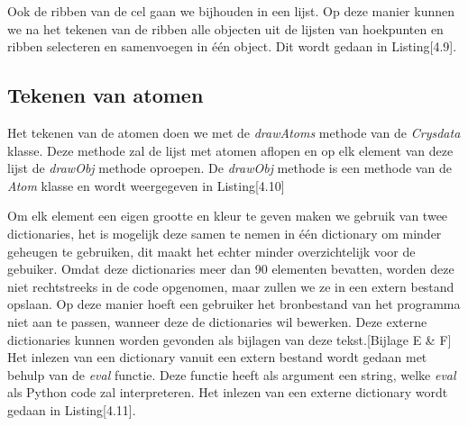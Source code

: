 Ook de ribben van de cel gaan we bijhouden in een lijst. Op deze manier kunnen we na het tekenen van de ribben alle objecten uit de lijsten van hoekpunten en ribben selecteren en samenvoegen in één object. Dit wordt gedaan in Listing[4.9].     

\subsection{Tekenen van atomen}

Het tekenen van de atomen doen we met de \textit{drawAtoms} methode van de \textit{Crysdata} klasse. Deze methode zal de lijst met atomen aflopen en op elk element van deze lijst de \textit{drawObj} methode oproepen. De \textit{drawObj} methode is een methode van de \textit{Atom} klasse en wordt weergegeven in Listing[4.10] 



Om elk element een eigen grootte en kleur te geven maken we gebruik van twee dictionaries, het is mogelijk deze samen te nemen in één dictionary om minder geheugen te gebruiken, dit maakt het echter minder overzichtelijk voor de gebuiker. Omdat deze dictionaries meer dan 90 elementen bevatten, worden deze niet rechtstreeks in de code opgenomen, maar zullen we ze in een extern bestand opslaan. Op deze manier hoeft een gebruiker het bronbestand van het programma niet aan te passen, wanneer deze de dictionaries wil bewerken. Deze externe dictionaries kunnen worden gevonden als bijlagen van deze tekst.[Bijlage E \& F] Het inlezen van een dictionary vanuit een extern bestand wordt gedaan met behulp van de \textit{eval} functie. Deze functie heeft als argument een string, welke \textit{eval} als Python code zal interpreteren. Het inlezen van een externe dictionary wordt gedaan in Listing[4.11]. 
  


